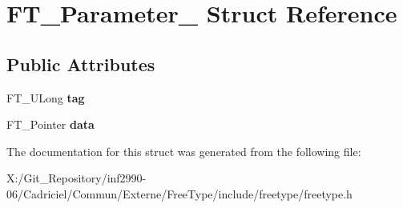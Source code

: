 \hypertarget{struct_f_t___parameter__}{\section{F\-T\-\_\-\-Parameter\-\_\- Struct Reference}
\label{struct_f_t___parameter__}
}
\subsection*{Public Attributes}
\begin{DoxyCompactItemize}
\item 
\hypertarget{struct_f_t___parameter___a5a53ef2652683a2cd9ee6a0a694cb76b}{F\-T\-\_\-\-U\-Long {\bfseries tag}}\label{struct_f_t___parameter___a5a53ef2652683a2cd9ee6a0a694cb76b}

\item 
\hypertarget{struct_f_t___parameter___a930c8885bd25be8d054443153c817c13}{F\-T\-\_\-\-Pointer {\bfseries data}}\label{struct_f_t___parameter___a930c8885bd25be8d054443153c817c13}

\end{DoxyCompactItemize}


The documentation for this struct was generated from the following file\-:\begin{DoxyCompactItemize}
\item 
X\-:/\-Git\-\_\-\-Repository/inf2990-\/06/\-Cadriciel/\-Commun/\-Externe/\-Free\-Type/include/freetype/freetype.\-h\end{DoxyCompactItemize}
